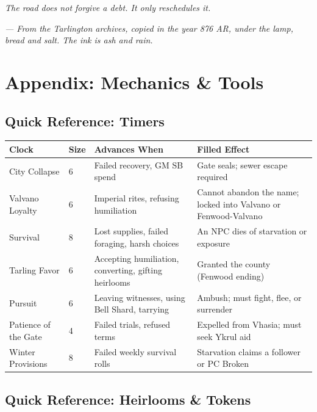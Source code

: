 \documentclass[11pt,a5paper]{book}
\begin{document}
\vspace{2em}
\noindent\textit{The road does not forgive a debt. It only reschedules it.}

\vspace{2em}
\noindent\textit{--- From the Tarlington archives, copied in the year 876 AR, under the lamp, bread and salt. The ink is ash and rain.}

\clearpage

\appendix
\chapter*{Appendix: Mechanics \& Tools}

\section*{Quick Reference: Timers}

\begin{center}
\begin{tabular}{@{}llp{6cm}p{5cm}@{}}
\toprule
\textbf{Clock} & \textbf{Size} & \textbf{Advances When} & \textbf{Filled Effect} \\
\midrule
City Collapse & 6 & Failed recovery, GM SB spend & Gate seals; sewer escape required \\
Valvano Loyalty & 6 & Imperial rites, refusing humiliation & Cannot abandon the name; locked into Valvano or Fenwood-Valvano \\
Survival & 8 & Lost supplies, failed foraging, harsh choices & An NPC dies of starvation or exposure \\
Tarling Favor & 6 & Accepting humiliation, converting, gifting heirlooms & Granted the county (Fenwood ending) \\
Pursuit & 6 & Leaving witnesses, using Bell Shard, tarrying & Ambush; must fight, flee, or surrender \\
Patience of the Gate & 4 & Failed trials, refused terms & Expelled from Vhasia; must seek Ykrul aid \\
Winter Provisions & 8 & Failed weekly survival rolls & Starvation claims a follower or PC Broken \\
\bottomrule
\end{tabular}
\end{center}

\section*{Quick Reference: Heirlooms \& Tokens}
\end{document}
